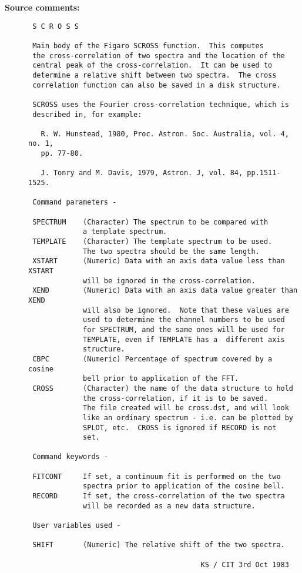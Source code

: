 \begin{description}
\item [{\bf Source comments:}]
\begin{verbatim}
 S C R O S S

 Main body of the Figaro SCROSS function.  This computes
 the cross-correlation of two spectra and the location of the
 central peak of the cross-correlation.  It can be used to
 determine a relative shift between two spectra.  The cross
 correlation function can also be saved in a disk structure.

 SCROSS uses the Fourier cross-correlation technique, which is
 described in, for example:

   R. W. Hunstead, 1980, Proc. Astron. Soc. Australia, vol. 4, no. 1,
   pp. 77-80.

   J. Tonry and M. Davis, 1979, Astron. J, vol. 84, pp.1511-1525.

 Command parameters -

 SPECTRUM    (Character) The spectrum to be compared with
             a template spectrum.
 TEMPLATE    (Character) The template spectrum to be used.
             The two spectra should be the same length.
 XSTART      (Numeric) Data with an axis data value less than XSTART
             will be ignored in the cross-correlation.
 XEND        (Numeric) Data with an axis data value greater than XEND
             will also be ignored.  Note that these values are
             used to determine the channel numbers to be used
             for SPECTRUM, and the same ones will be used for
             TEMPLATE, even if TEMPLATE has a  different axis
             structure.
 CBPC        (Numeric) Percentage of spectrum covered by a cosine
             bell prior to application of the FFT.
 CROSS       (Character) the name of the data structure to hold
             the cross-correlation, if it is to be saved.
             The file created will be cross.dst, and will look
             like an ordinary spectrum - i.e. can be plotted by
             SPLOT, etc.  CROSS is ignored if RECORD is not
             set.

 Command keywords -

 FITCONT     If set, a continuum fit is performed on the two
             spectra prior to application of the cosine bell.
 RECORD      If set, the cross-correlation of the two spectra
             will be recorded as a new data structure.

 User variables used -

 SHIFT       (Numeric) The relative shift of the two spectra.

                                         KS / CIT 3rd Oct 1983
\end{verbatim}
\end{description}
